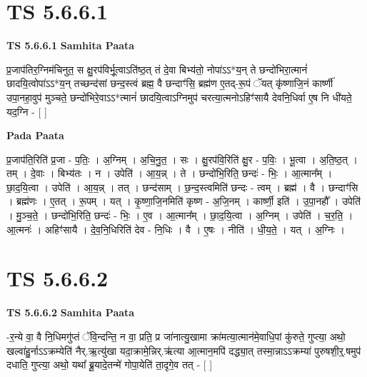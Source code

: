 \documentclass[17pt]{extarticle}
\begin{document}

\section{ TS 5.6.6.1 }

\textbf{TS 5.6.6.1 } \newline
\textbf{Samhita Paata} \newline

प्र॒जाप॑तिर॒ग्निम॑चिनुत॒ स क्षु॒रप॑विर्भू॒त्वाऽति॑ष्ठ॒त् तं दे॒वा बिभ्य॑तो॒ नोपा॑ऽऽ*य॒न् ते छन्दो॑भिरा॒त्मानं॑ छादयि॒त्वोपा॑ऽऽ*य॒न् तच्छन्द॑सां छन्द॒स्त्वं ब्रह्म॒ वै छन्दाꣳ॑सि॒ ब्रह्म॑ण ए॒तद्-रू॒पं ॅयत् कृ॑ष्णाजि॒नं कार्ष्णी॑ उपा॒नहा॒वुप॑ मुञ्चते॒ छन्दो॑भिरे॒वाऽऽ*त्मानं॑ छादयि॒त्वाऽग्निमुप॑ चरत्या॒त्मनोऽहिꣳ॑सायै देवनि॒धिर्वा ए॒ष नि धी॑यते॒ यद॒ग्नि - [  ] \newline

\textbf{Pada Paata} \newline

प्र॒जाप॑ति॒रिति॑ प्र॒जा - प॒तिः॒ । अ॒ग्निम् । अ॒चि॒नु॒त॒ । सः । क्षु॒रप॑वि॒रिति॑ क्षु॒र - प॒विः॒ । भू॒त्वा । अ॒ति॒ष्ठ॒त् । तम् । दे॒वाः । बिभ्य॑तः । न । उपेति॑ । आ॒य॒न्न् । ते । छन्दो॑भि॒रिति॒ छन्दः॑ - भिः॒ । आ॒त्मान᳚म् । छा॒द॒यि॒त्वा । उपेति॑ । आ॒य॒न्न् । तत् । छन्द॑साम् । छ॒न्द॒स्त्वमिति॑ छन्दः - त्वम् । ब्रह्म॑ । वै । छन्दाꣳ॑सि । ब्रह्म॑णः । ए॒तत् । रू॒पम् । यत् । कृ॒ष्णा॒जि॒नमिति॑ कृष्ण - अ॒जि॒नम् । कार्ष्णी॒ इति॑ । उ॒पा॒नहौ᳚ । उपेति॑ । मु॒ञ्च॒ते॒ । छन्दो॑भि॒रिति॒ छन्दः॑ - भिः॒ । ए॒व । आ॒त्मान᳚म् । छा॒द॒यि॒त्वा । अ॒ग्निम् । उपेति॑ । च॒र॒ति॒ । आ॒त्मनः॑ । अहिꣳ॑सायै । दे॒व॒नि॒धिरिति॑ देव - नि॒धिः । वै । ए॒षः । नीति॑ । धी॒य॒ते॒ । यत् । अ॒ग्निः ।  \newline





\section{ TS 5.6.6.2 }

\textbf{TS 5.6.6.2 } \newline
\textbf{Samhita Paata} \newline

-र॒न्ये वा॒ वै नि॒धिमगु॑प्तं ॅवि॒न्दन्ति॒ न वा॒ प्रति॒ प्र जा॑नात्यु॒खामा क्रा॑मत्या॒त्मान॑मे॒वाधि॒पां कु॑रुते॒ गुप्त्या॒ अथो॒ खल्वा॑हु॒र्नाऽऽक्रम्येति॑ नैर्.ऋ॒त्यु॑खा यदा॒क्रामे॒न्निर्.ऋ॑त्या आ॒त्मान॒मपि॑ दद्ध्या॒त् तस्मा॒न्नाऽऽक्रम्या॑ पुरुषशी॒र्॒.षमुप॑ दधाति॒ गुप्त्या॒ अथो॒ यथा᳚ ब्रू॒यादे॒तन्मे॑ गोपा॒येति॑ ता॒दृगे॒व तत् - [  ] \newline
\end{document}
